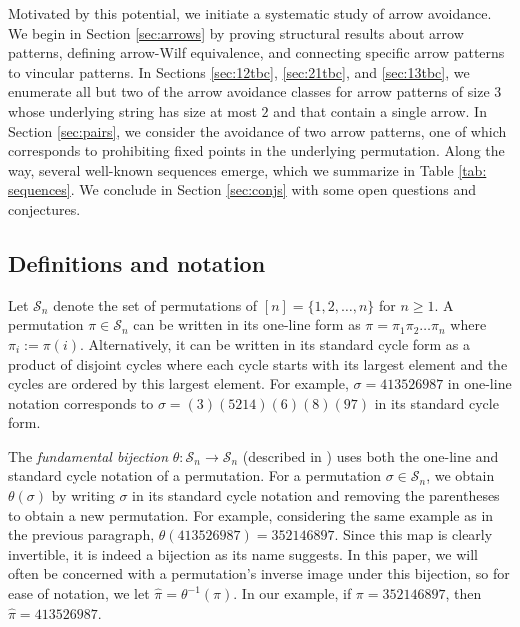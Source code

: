 \documentclass[11pt]{article}
\renewcommand\S{\mathcal S}
\theoremstyle{definition}
\begin{document}
Motivated by this potential, we initiate a systematic study of arrow avoidance. We begin in Section \ref{sec:arrows} by proving structural results about arrow patterns, defining arrow-Wilf equivalence, and connecting specific arrow patterns to vincular patterns. In Sections \ref{sec:12tbc}, \ref{sec:21tbc}, and \ref{sec:13tbc}, we enumerate all but two of the arrow avoidance classes for arrow patterns of size 3 whose underlying string has size at most $2$ and that contain a single arrow. In Section \ref{sec:pairs}, we consider the avoidance of two arrow patterns, one of which corresponds to prohibiting fixed points in the underlying permutation. Along the way, several well-known sequences emerge, which we summarize in Table \ref{tab: sequences}. We conclude in Section \ref{sec:conjs} with some open questions and conjectures.


\subsection{Definitions and notation}
Let $\S_n$ denote the set of permutations of $[n]=\{1,2,\ldots, n\}$ for $n\geq 1.$ A permutation $\pi\in\S_n$ can be written in its one-line form as $\pi = \pi_1\pi_2\ldots \pi_n$ where $\pi_i:=\pi(i)$. Alternatively, it can be written in its standard cycle form as a product of disjoint cycles where each cycle starts with its largest element and the cycles are ordered by this largest element. For example, $\sigma = 413526987$ in one-line notation corresponds to $\sigma = (3)(5214)(6)(8)(97)$ in its standard cycle form.

The \emph{fundamental bijection} $\theta:\mathcal{S}_n\to\mathcal{S}_n$ (described in \cite[Page 30]{S11}) uses both the one-line and standard cycle notation of a permutation.
For a permutation $\sigma \in \mathcal{S}_n$, we obtain $\theta(\sigma)$ by writing $\sigma$ in its standard cycle notation and removing the parentheses to obtain a new permutation. For example, considering the same example as in the previous paragraph, $\theta(413526987) = 352146897.$ Since this map is clearly invertible, it is indeed a bijection as its name suggests. In this paper, we will often be concerned with a permutation's inverse image under this bijection, so for ease of notation, we let $\hat\pi=\theta^{-1}(\pi).$ In our example, if $\pi = 352146897$, then $\hat\pi = 413526987.$
\end{document}
